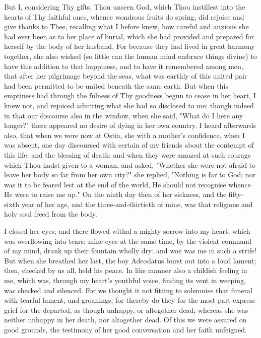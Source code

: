 \documentclass[b5paper,openright,12pt,twoside]{book}
\begin{document}
But I, considering Thy gifts, Thou unseen God, which Thou instillest
into the hearts of Thy faithful ones, whence wondrous fruits do spring,
did rejoice and give thanks to Thee, recalling what I before knew, how
careful and anxious she had ever been as to her place of burial, which
she had provided and prepared for herself by the body of her husband.
For because they had lived in great harmony together, she also wished
(so little can the human mind embrace things divine) to have this
addition to that happiness, and to have it remembered among men, that
after her pilgrimage beyond the seas, what was earthly of this united
pair had been permitted to be united beneath the same earth. But when
this emptiness had through the fulness of Thy goodness begun to cease in
her heart, I knew not, and rejoiced admiring what she had so disclosed
to me; though indeed in that our discourse also in the window, when she
said, "What do I here any longer?" there appeared no desire of dying
in her own country. I heard afterwards also, that when we were now
at Ostia, she with a mother's confidence, when I was absent, one day
discoursed with certain of my friends about the contempt of this life,
and the blessing of death: and when they were amazed at such courage
which Thou hadst given to a woman, and asked, "Whether she were not
afraid to leave her body so far from her own city?" she replied,
"Nothing is far to God; nor was it to be feared lest at the end of the
world, He should not recognise whence He were to raise me up." On the
ninth day then of her sickness, and the fifty-sixth year of her age, and
the three-and-thirtieth of mine, was that religious and holy soul freed
from the body.

I closed her eyes; and there flowed withal a mighty sorrow into my
heart, which was overflowing into tears; mine eyes at the same time, by
the violent command of my mind, drank up their fountain wholly dry; and
woe was me in such a strife! But when she breathed her last, the boy
Adeodatus burst out into a loud lament; then, checked by us all, held
his peace. In like manner also a childish feeling in me, which was,
through my heart's youthful voice, finding its vent in weeping, was
checked and silenced. For we thought it not fitting to solemnise that
funeral with tearful lament, and groanings; for thereby do they for
the most part express grief for the departed, as though unhappy, or
altogether dead; whereas she was neither unhappy in her death, nor
altogether dead. Of this we were assured on good grounds, the testimony
of her good conversation and her faith unfeigned.
\end{document}
